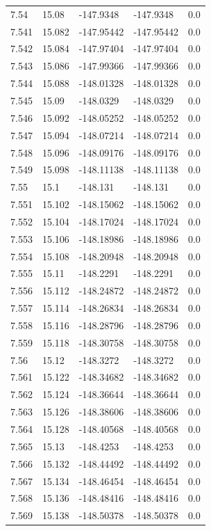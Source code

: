 \begin{tabular}{lllll}
7.54 & 15.08 & -147.9348 & -147.9348 & 0.0 \\
7.541 & 15.082 & -147.95442 & -147.95442 & 0.0 \\
7.542 & 15.084 & -147.97404 & -147.97404 & 0.0 \\
7.543 & 15.086 & -147.99366 & -147.99366 & 0.0 \\
7.544 & 15.088 & -148.01328 & -148.01328 & 0.0 \\
7.545 & 15.09 & -148.0329 & -148.0329 & 0.0 \\
7.546 & 15.092 & -148.05252 & -148.05252 & 0.0 \\
7.547 & 15.094 & -148.07214 & -148.07214 & 0.0 \\
7.548 & 15.096 & -148.09176 & -148.09176 & 0.0 \\
7.549 & 15.098 & -148.11138 & -148.11138 & 0.0 \\
7.55 & 15.1 & -148.131 & -148.131 & 0.0 \\
7.551 & 15.102 & -148.15062 & -148.15062 & 0.0 \\
7.552 & 15.104 & -148.17024 & -148.17024 & 0.0 \\
7.553 & 15.106 & -148.18986 & -148.18986 & 0.0 \\
7.554 & 15.108 & -148.20948 & -148.20948 & 0.0 \\
7.555 & 15.11 & -148.2291 & -148.2291 & 0.0 \\
7.556 & 15.112 & -148.24872 & -148.24872 & 0.0 \\
7.557 & 15.114 & -148.26834 & -148.26834 & 0.0 \\
7.558 & 15.116 & -148.28796 & -148.28796 & 0.0 \\
7.559 & 15.118 & -148.30758 & -148.30758 & 0.0 \\
7.56 & 15.12 & -148.3272 & -148.3272 & 0.0 \\
7.561 & 15.122 & -148.34682 & -148.34682 & 0.0 \\
7.562 & 15.124 & -148.36644 & -148.36644 & 0.0 \\
7.563 & 15.126 & -148.38606 & -148.38606 & 0.0 \\
7.564 & 15.128 & -148.40568 & -148.40568 & 0.0 \\
7.565 & 15.13 & -148.4253 & -148.4253 & 0.0 \\
7.566 & 15.132 & -148.44492 & -148.44492 & 0.0 \\
7.567 & 15.134 & -148.46454 & -148.46454 & 0.0 \\
7.568 & 15.136 & -148.48416 & -148.48416 & 0.0 \\
7.569 & 15.138 & -148.50378 & -148.50378 & 0.0 \\

\end{tabular}
